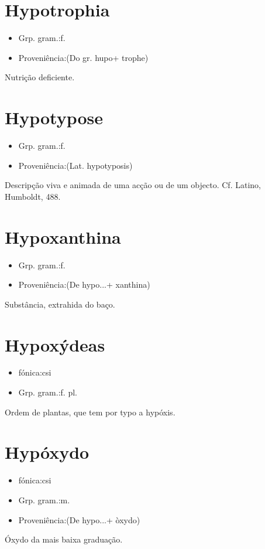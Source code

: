 \documentclass{article}
\begin{document}
\section{Hypotrophia}
\begin{itemize}
\item {Grp. gram.:f.}
\end{itemize}
\begin{itemize}
\item {Proveniência:(Do gr. \textunderscore hupo\textunderscore  + \textunderscore trophe\textunderscore )}
\end{itemize}
Nutrição deficiente.
\section{Hypotypose}
\begin{itemize}
\item {Grp. gram.:f.}
\end{itemize}
\begin{itemize}
\item {Proveniência:(Lat. \textunderscore hypotyposis\textunderscore )}
\end{itemize}
Descripção viva e animada de uma acção ou de um objecto. Cf. Latino, \textunderscore Humboldt\textunderscore , 488.
\section{Hypoxanthina}
\begin{itemize}
\item {Grp. gram.:f.}
\end{itemize}
\begin{itemize}
\item {Proveniência:(De \textunderscore hypo...\textunderscore  + \textunderscore xanthina\textunderscore )}
\end{itemize}
Substância, extrahida do baço.
\section{Hypoxýdeas}
\begin{itemize}
\item {fónica:csi}
\end{itemize}
\begin{itemize}
\item {Grp. gram.:f. pl.}
\end{itemize}
Ordem de plantas, que tem por typo a hypóxis.
\section{Hypóxydo}
\begin{itemize}
\item {fónica:csi}
\end{itemize}
\begin{itemize}
\item {Grp. gram.:m.}
\end{itemize}
\begin{itemize}
\item {Proveniência:(De \textunderscore hypo...\textunderscore  + \textunderscore òxydo\textunderscore )}
\end{itemize}
Óxydo da mais baixa graduação.
\end{document}
